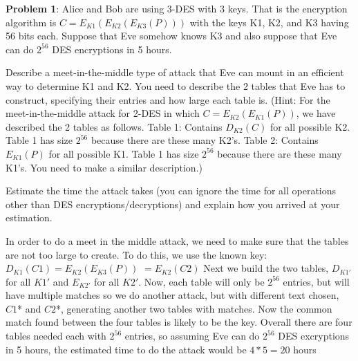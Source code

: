 \documentclass[12pt,letterpaper,final]{report}
\begin{document}

\vline


\noindent\textbf{Problem 1}: Alice and Bob are using 3-DES with 3 keys. That is the encryption algorithm is $C = E_{K1} (E_{K2} (E_{K3} (P)))$ with the keys K1, K2, and K3 having 56 bits each. Suppose that Eve somehow knows K3 and also suppose that Eve can do $2^{56}$ DES encryptions in 5 hours. 
\begin{alphalist}
	\item Describe a meet-in-the-middle type of attack that Eve can mount in an efficient way to determine K1 and K2. You need to describe the 2  tables that Eve has to construct, specifying their entries and how large each table is. (Hint: For the meet-in-the-middle attack for 2-DES in which $C = E_{K2} (E_{K1} (P))$, we have described the 2 tables as follows. Table 1: Contains $D_{K2}(C)$ for all possible K2. Table 1 has size $2^{56}$ because there are these many K2's. Table 2: Contains $E_{K1}(P)$ for all possible K1. Table 1 has size $2^{56}$ because there are these many K1's. You need to make a similar description.)
	\item Estimate the time the attack takes (you can ignore the time for all operations other than DES encryptions/decryptions) and explain how you arrived at your estimation.
\end{alphalist}

 In order to do a meet in the middle attack, we need to make sure that the tables are not too large to create. To do this, we use the known key:
\newline $D_{K1}(C1) = E_{K2}(E_{K3}(P))$
\newline $= E_{K2}(C2)$
\newline\indent Next we build the two tables, $D_{K1'}$ for all $K1'$ and $E_{K2'}$ for all $ K2'$.
\newline\indent Now, each table will only be $2^{56}$ entries, but will have multiple matches so we do another attack, but with different text chosen, $C1$* and $C2$*, generating another two tables with matches.
\newline\indent Now the common match found between the four tables is likely to be the key.
\newline\indent Overall there are four tables needed each with $2^{56}$ entries, so assuming Eve can do $2^{56}$ DES excryptions in 5 hours, the estimated time to do the attack would be $4 * 5 = 20$ hours
\end{document}
